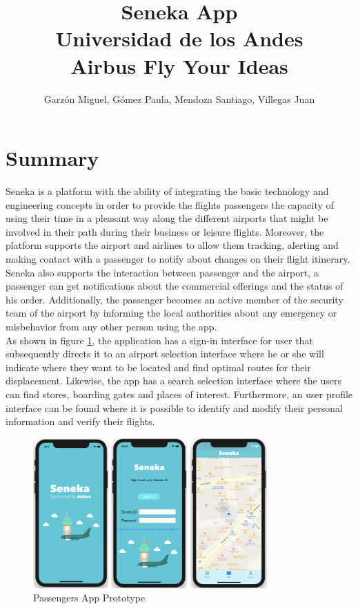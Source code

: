 \documentclass[12pt]{article}
\begin{document}
\title{Seneka App\\
Universidad de los Andes\\
Airbus Fly Your Ideas}
\author{Garzón Miguel, Gómez Paula, Mendoza Santiago, Villegas Juan}
\maketitle


\section{Summary}

Seneka is a platform with the ability of integrating the basic technology and engineering concepts in order to provide the flights passengers the capacity of using their time in a pleasant way along the different airports that might be involved in their path during their business or leisure flights. Moreover, the platform supports the airport and airlines to allow them tracking, alerting and making contact with a passenger to notify about changes on their flight itinerary. Seneka also supports the interaction between passenger and the airport, a passenger can get notifications about the commercial offerings and the status of his order. Additionally, the passenger becomes an active member of the security team of the airport by informing the local authorities about any emergency or misbehavior from any other person using the app.\\
As shown in figure \ref{visualization}, the application has a sign-in interface for user that subsequently directs it to an airport selection interface where he or she will indicate where they want to be located and find optimal routes for their displacement. Likewise, the app has a search selection interface where the users can find stores, boarding gates and places of interest. Furthermore, an user profile interface can be found where it is possible to identify and modify their personal information and verify their flights.\\

\begin{figure}[H]
	\centering
	\includegraphics[width=0.8\textwidth]{Visualization.jpg}
	\caption{Passengers App Prototype}
	\label{visualization}
\end{figure}
\end{document}
